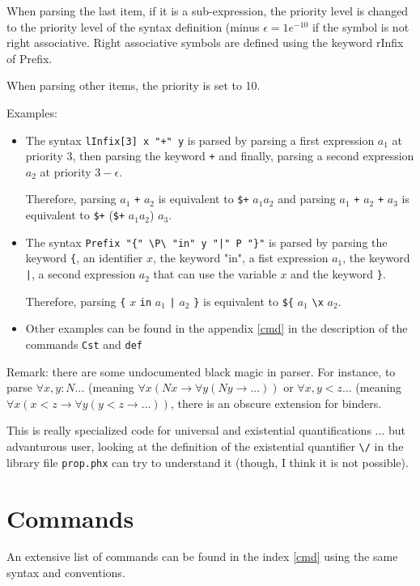 \begin{enumerate}
\begin{itemize}
When parsing the last item, if it is a sub-expression, the
priority level is changed to the priority level of the syntax
definition (minus $\epsilon = 1e^{-10}$ if the symbol is not right
associative. Right associative symbols are defined using the keyword
rInfix of Prefix.

When parsing other items, the priority is set to 10.

\end{itemize}
\end{enumerate}

Examples:
\begin{itemize}
\item The syntax \verb#lInfix[3] x "+" y# is parsed by parsing
a first expression $a_1$ at priority $3$, then parsing the keyword
\verb#+# and finally, parsing a second expression $a_2$ at priority
$3 - \epsilon$. 

Therefore, parsing $a_1$ \verb#+# $a_2$ is equivalent to
\verb#$+# $a_1 a_2$ and parsing $a_1$ \verb#+# $a_2$ \verb#+# $a_3$ 
is equivalent to
\verb#$+# (\verb#$+# $a_1 a_2$) $a_3$.

\item The syntax \verb#Prefix "{" \P\ "in" y "|" P "}"# is parsed by
parsing the keyword \verb#{#, an identifier $x$, the keyword "in", a
fist expression $a_1$, the keyword \verb#|#, a second expression $a_2$
that can use the variable $x$ and the   keyword \verb#}#.

Therefore, parsing \verb#{# $x$ \verb#in# $a_1$ \verb#|# $a_2$
\verb#}# is equivalent to \verb#${# $a_1$ \verb#\x# $a_2$.

\item Other examples can be found in the appendix \ref{cmd} in the
description of the commands \verb#Cst# and \verb#def#

\end{itemize}

Remark: there are some undocumented black magic in \AFD parser. For
instance, to parse $\forall x,y:N \dots$ (meaning 
$\forall x (N x \rightarrow \forall y (N y \rightarrow \dots))$ or 
$\forall x,y < z \dots$ (meaning 
$\forall x (x < z \rightarrow \forall y (y < z \rightarrow \dots))$,
there is an obscure extension for binders.

This is really specialized code for universal and existential
quantifications ... but advanturous user, looking at the definition of
the existential quantifier \verb#\/# in the library file
\verb#prop.phx# can try to understand it (though, I think it is not
possible).

\section{Commands}

An extensive list of commands can be found in the index \ref{cmd}
using the same syntax and conventions.




